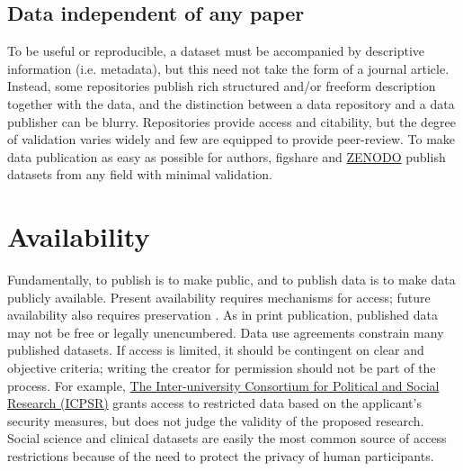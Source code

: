 \documentclass[10pt,twocolumn]{article}
\begin{document}
\subsection*{Data independent of any paper}\label{paper-independent-data}

To be useful or reproducible, a dataset must be accompanied by descriptive information (i.e. metadata)\cite{gray_online_2002}, but this need not take the form of a journal article.
Instead, some repositories publish rich structured and/or freeform description together with the data, and the distinction between a data repository and a data publisher can be blurry.
Repositories provide access and citability, but the degree of validation varies widely and few are equipped to provide peer-review.
To make data publication as easy as possible for authors, figshare and \href{https://zenodo.org/}{ZENODO} publish datasets from any field with minimal validation.

\section*{Availability}\label{availability}

Fundamentally, to publish is to make public, and to publish data is to make data publicly available.
Present availability requires mechanisms for access; future availability also requires preservation \cite{beagrie_digital_2008, gray_online_2002}.
As in print publication, published data may not be free or legally unencumbered.
Data use agreements constrain many published datasets.
If access is limited, it should be contingent on clear and objective criteria; writing the creator for permission should not be part of the process.
For example, \href{http://www.icpsr.umich.edu/icpsrweb/content/deposit/confidentiality.html}{The Inter-university Consortium for Political and Social Research (ICPSR)} grants access to restricted data based on the applicant's security measures, but does not judge the validity of the proposed research.
Social science and clinical datasets are easily the most common source of access restrictions because of the need to protect the privacy of human participants.
\end{document}
